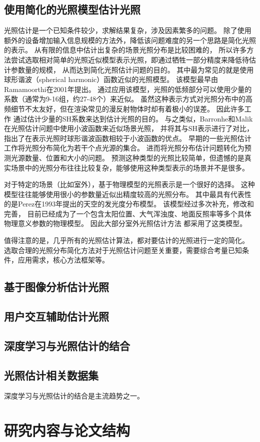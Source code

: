 \subsection{使用简化的光照模型估计光照}
光照估计是一个已知条件较少，求解结果复杂，涉及因素繁多的问题。
除了使用额外的设备增加输入信息规模的方法外，降低该问题难度的另一个思路是简化光照的表示。
从有限的信息中估计出复杂的场景光照分布是比较困难的，
所以许多方法尝试选取相对简单的光照近似模型表示光照，即通过牺牲一部分精度来降低待估计参数量的规模，
从而达到简化光照估计问题的目的。
其中最为常见的就是使用球形谐波（spherical harmonic）函数近似的光照模型。
该模型最早由Ramamoorthi\cite{ramamoorthi2001efficient}在2001年提出。
通过应用该模型，光照的低频部分可以使用少量的系数（通常为9-16组，约27-48个）来近似。
虽然这种表示方式对光照分布中的高频细节不太友好，但在渲染常见的漫反射物体时却有着极小的误差。
因此许多工作\cite{ramamoorthi2001signal,kemelmacher20113d,garrido2013reconstructing,
knorr2014real,li2014intrinsic,barron2015shape, rematas2016deep}
通过估计少量的SH系数来达到估计光照的目的。
与之类似，Barronhe和Malik\cite{okabe2004spherical}在光照估计问题中使用小波函数来近似场景光照，
并将其与SH表示进行了对比，指出了在表示光照时球形谐波函数相较于小波函数的优点。
早期的一些光照估计工作\cite{sato1999acquiring,  panagopoulos2011illumination, 
wang2002estimation, li2003multiple, sato2003illumination}将光照分布简化为若干个点光源的集合。
进而将光照分布估计问题转化为预测光源数量、位置和大小的问题。
预测这种类型的光照比较简单，但遗憾的是真实场景中的光照分布往往比较复杂，能够使用这种类型表示的场景并不是很多。

对于特定的场景（比如室外），基于物理模型的光照表示是一个很好的选择。
这种模型往往能够使用很小的参数量近似出精度较高的光照分布。
其中最具有代表性的是Perez\cite{perez1993all}在1993年提出的天空的发光度分布模型。
该模型经过多次补充，修改和完善\cite{nishita1996display, sirai1993display,
preetham1999practical,raab2008unbiased,hosek2012analytic, hovsekhovsek2013adding}，
目前已经成为了一个包含太阳位置、大气浑浊度、地面反照率等多个具体物理意义参数的物理模型。
因此大部分室外光照估计方法\cite{lalonde2008does, lalonde2010sun, lalonde2012estimating, sunkavalli2008color}
都采用了这类模型。

值得注意的是，几乎所有的光照估计算法，都对要估计的光照进行一定的简化。
选取合理的光照分布简化方法对于光照估计问题至关重要，需要综合考量已知条件，应用需求，核心方法框架等。

\subsection{基于图像分析估计光照}
\cite{karsch2014automatic}
\cite{lombardi2016reflectance}
\subsection{用户交互辅助估计光照}
\subsection{深度学习与光照估计的结合}

\subsection{光照估计相关数据集}

深度学习与光照估计的结合是主流趋势之一。
\section{研究内容与论文结构}